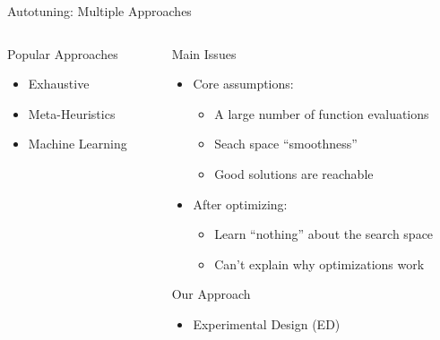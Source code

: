 \documentclass[10pt, compress, aspectratio=169, xcolor={table,usenames,dvipsnames}]{beamer}
\begin{document}
\begin{frame}[label={sec:org5fc6c76}]{Autotuning: Multiple Approaches}
\begin{columns}
\begin{column}{0.5\columnwidth}
\begin{block}{Popular Approaches}
\footnotesize
\begin{itemize}
\item \colorbox{red!25}{Exhaustive}
\item \colorbox{green!25}{Meta-Heuristics}
\item \colorbox{cyan!25}{Machine Learning}
\end{itemize}
\normalsize

\vspace{-.4cm}


\end{block}
\end{column}

\begin{column}{0.5\columnwidth}
\begin{block}{Main Issues}
\begin{itemize}
\item Core \alert{assumptions}:
\begin{itemize}
\item A large number of function evaluations
\item Seach space ``smoothness''
\item Good solutions are reachable
\end{itemize}
\item After optimizing:
\begin{itemize}
\item \alert{Learn ``nothing''} about the search space
\item \alert{Can't explain} why optimizations work
\end{itemize}
\end{itemize}
\begin{block}{Our Approach}
\begin{itemize}
\item \alert{Experimental Design} (\alert{ED})
\end{itemize}
\end{block}
\end{block}
\end{column}
\end{columns}
\end{frame}
\end{document}
